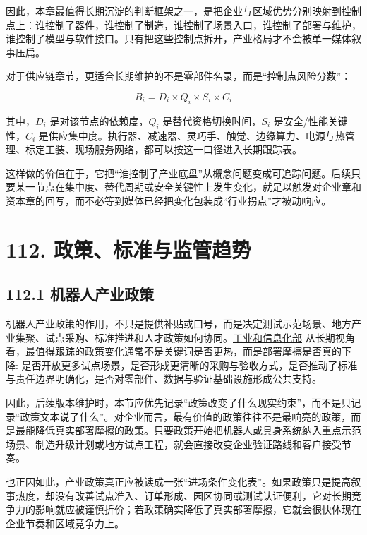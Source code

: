 因此，本章最值得长期沉淀的判断框架之一，是把企业与区域优势分别映射到控制点上：谁控制了器件，谁控制了制造，谁控制了场景入口，谁控制了部署与维护，谁控制了模型与软件接口。只有把这些控制点拆开，产业格局才不会被单一媒体叙事压扁。

对于供应链章节，更适合长期维护的不是零部件名录，而是“控制点风险分数”：

\begin{equation*}
B_i = D_i \times Q_i \times S_i \times C_i
\end{equation*}

其中，\(D_i\) 是对该节点的依赖度，\(Q_i\) 是替代资格切换时间，\(S_i\) 是安全/性能关键性，\(C_i\) 是供应集中度。执行器、减速器、灵巧手、触觉、边缘算力、电源与热管理、标定工装、现场服务网络，都可以按这一口径进入长期跟踪表。

这样做的价值在于，它把“谁控制了产业底盘”从概念问题变成可追踪问题。后续只要某一节点在集中度、替代周期或安全关键性上发生变化，就足以触发对企业章和资本章的回写，而不必等到媒体已经把变化包装成“行业拐点”才被动响应。

\section*{112. 政策、标准与监管趋势}

\subsection*{112.1 机器人产业政策}


机器人产业政策的作用，不只是提供补贴或口号，而是决定测试示范场景、地方产业集聚、试点采购、标准推进和人才政策如何协同。\href{https://www.miit.gov.cn/}{工业和信息化部} 从长期视角看，最值得跟踪的政策变化通常不是关键词是否更热，而是部署摩擦是否真的下降: 是否开放更多试点场景，是否形成更清晰的采购与验收方式，是否推动了标准与责任边界明确化，是否对零部件、数据与验证基础设施形成公共支持。

因此，后续版本维护时，本节应优先记录“政策改变了什么现实约束”，而不是只记录“政策文本说了什么”。对企业而言，最有价值的政策往往不是最响亮的政策，而是最能降低真实部署摩擦的政策。只要政策开始把机器人或具身系统纳入重点示范场景、制造升级计划或地方试点工程，就会直接改变企业验证路线和客户接受节奏。

也正因如此，产业政策真正应被读成一张“进场条件变化表”。如果政策只是提高叙事热度，却没有改善试点准入、订单形成、园区协同或测试认证便利，它对长期竞争力的影响就应被谨慎折价；若政策确实降低了真实部署摩擦，它就会很快体现在企业节奏和区域竞争力上。

